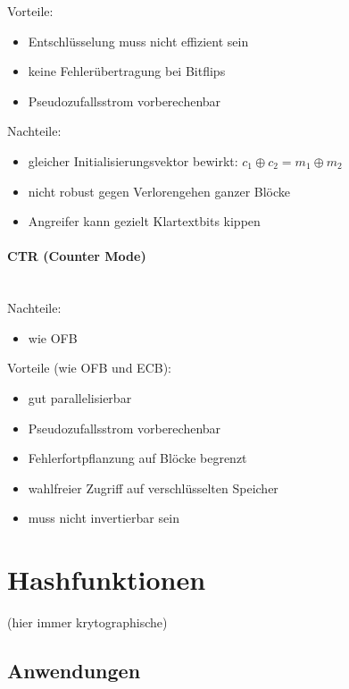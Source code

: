 \documentclass[a4paper,twoside,DIV15,BCOR12mm]{scrbook}
\begin{document}
Vorteile:

\begin{itemize}
	\item Entschlüsselung muss nicht effizient sein
	\item keine Fehlerübertragung bei Bitflips
	\item Pseudozufallsstrom vorberechenbar
\end{itemize}

Nachteile:

\begin{itemize}
	\item gleicher Initialisierungsvektor bewirkt: $c_1 \oplus c_2 = m_1 \oplus m_2$
	\item nicht robust gegen Verlorengehen ganzer Blöcke
	\item Angreifer kann gezielt Klartextbits kippen
\end{itemize}

\subsubsection{CTR (Counter Mode)}

\\

Nachteile:

\begin{itemize}
	\item wie OFB
\end{itemize}

Vorteile (wie OFB und ECB):

\begin{itemize}	
	\item gut parallelisierbar
	\item Pseudozufallsstrom vorberechenbar
	\item Fehlerfortpflanzung auf Blöcke begrenzt
	\item wahlfreier Zugriff auf verschlüsselten Speicher
	\item muss nicht invertierbar sein
\end{itemize}


\chapter{Hashfunktionen}

(hier immer krytographische)

\section{Anwendungen}
\end{document}
